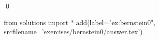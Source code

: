 
\begin{ex} 
  \label{ex:bernstein0}
  
  \qed
\end{ex} 
\begin{python0}
from solutions import *
add(label="ex:bernstein0",
    srcfilename='exercises/bernstein0/answer.tex') 
\end{python0}
